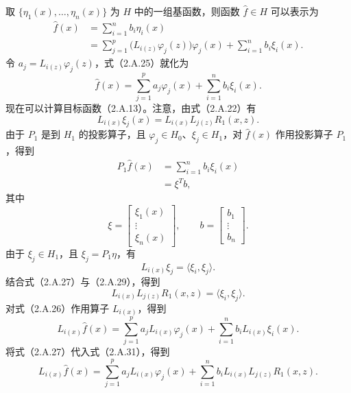 取 $\{\eta_1(x),\ldots,\eta_n(x)\}$ 为 $H$ 中的一组基函数，则函数 $\widehat f\in H$ 可以表示为
\begin{equation}
\begin{aligned}
\widehat f(x)&=\sum_{i=1}^nb_i\eta_i(x)\\
 &=\sum_{j=1}^p\bigl(L_{i(z)}\varphi_j(z)\bigr)\varphi_j(x)
   +\sum_{i=1}^nb_i\xi_i(x).
\end{aligned}\tag{2.A.25}
\end{equation}
令 $a_j=L_{i(z)}\varphi_j(z)$，式（2.A.25）就化为
\begin{equation}
\widehat f(x)=\sum_{j=1}^pa_j\varphi_j(x)+\sum_{i=1}^nb_i\xi_i(x).\tag{2.A.26}
\end{equation}
现在可以计算目标函数（2.A.13）。注意，由式（2.A.22）有
\begin{equation}
L_{i(x)}\xi_j(x)=L_{i(x)}L_{j(z)}R_1(x,z).\tag{2.A.27}
\end{equation}
由于 $P_1$ 是到 $H_1$ 的投影算子，且 $\varphi_j\in H_0$、$\xi_j\in H_1$，对 $\widehat f(x)$ 作用投影算子 $P_1$，得到
\begin{equation}
\begin{aligned}
P_1\widehat f(x)&=\sum_{i=1}^nb_i\xi_i(x)\\
 &=\xi^Tb,
\end{aligned}\tag{2.A.28}
\end{equation}
其中
\[
\xi=\begin{bmatrix}\xi_1(x)\\\vdots\\\xi_n(x)\end{bmatrix},
\qquad b=\begin{bmatrix}b_1\\\vdots\\b_n\end{bmatrix}.
\]
由于 $\xi_j\in H_1$，且 $\xi_j=P_1\eta$，有
\begin{equation}
L_{i(x)}\xi_j=\langle\xi_i,\xi_j\rangle.\tag{2.A.29}
\end{equation}
结合式（2.A.27）与（2.A.29），得到
\begin{equation}
L_{i(x)}L_{j(z)}R_1(x,z)=\langle\xi_i,\xi_j\rangle.\tag{2.A.30}
\end{equation}
对式（2.A.26）作用算子 $L_{i(x)}$，得到
\begin{equation}
L_{i(x)}\widehat f(x)
 =\sum_{j=1}^pa_jL_{i(x)}\varphi_j(x)
  +\sum_{i=1}^nb_iL_{i(x)}\xi_i(x).\tag{2.A.31}
\end{equation}
将式（2.A.27）代入式（2.A.31），得到
\begin{equation}
L_{i(x)}\widehat f(x)
 =\sum_{j=1}^pa_jL_{i(x)}\varphi_j(x)
  +\sum_{i=1}^nb_iL_{i(x)}L_{j(z)}R_1(x,z).\tag{2.A.32}
\end{equation}
